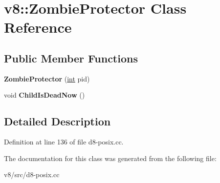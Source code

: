 \hypertarget{classv8_1_1ZombieProtector}{}\section{v8\+:\+:Zombie\+Protector Class Reference}
\label{classv8_1_1ZombieProtector}
\subsection*{Public Member Functions}
\begin{DoxyCompactItemize}
\item 
\mbox{\label{classv8_1_1ZombieProtector_ada6e7c6ad75a7e51dd15d747e30296ec}} 
{\bfseries Zombie\+Protector} (\mbox{\hyperlink{classint}{int}} pid)
\item 
\mbox{\label{classv8_1_1ZombieProtector_afd835b383e9b8127209d8dc518637f23}} 
void {\bfseries Child\+Is\+Dead\+Now} ()
\end{DoxyCompactItemize}


\subsection{Detailed Description}


Definition at line 136 of file d8-\/posix.\+cc.



The documentation for this class was generated from the following file\+:\begin{DoxyCompactItemize}
\item 
v8/src/d8-\/posix.\+cc\end{DoxyCompactItemize}
